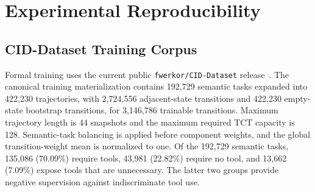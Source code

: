 \section{Experimental Reproducibility}
\label{app:reproducibility}

\subsection{CID-Dataset Training Corpus}

Formal training uses the current public \texttt{fwerkor/CID-Dataset} release~\cite{cao2026ciddataset}. The canonical training materialization contains 192,729 semantic tasks expanded into 422,230 trajectories, with 2,724,556 adjacent-state transitions and 422,230 empty-state bootstrap transitions, for 3,146,786 trainable transitions. Maximum trajectory length is 44 snapshots and the maximum required TCT capacity is 128. Semantic-task balancing is applied before component weights, and the global transition-weight mean is normalized to one. Of the 192,729 semantic tasks, 135,086 (70.09\%) require tools, 43,981 (22.82\%) require no tool, and 13,662 (7.09\%) expose tools that are unnecessary. The latter two groups provide negative supervision against indiscriminate tool use.

